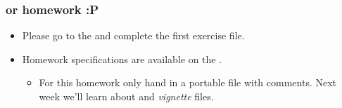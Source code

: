 \begin{frame}[allowframebreaks]
  \frametitle{or homework :P}
  \begin{itemize}
  \item Please go to the  and complete the first exercise file.
  \item Homework specifications are available on the . 
  \begin{itemize}
    \item For this homework only hand in a portable  file with comments. Next week we'll learn about  and \emph{vignette} files.
  \end{itemize}
  \end{itemize}
\end{frame}



